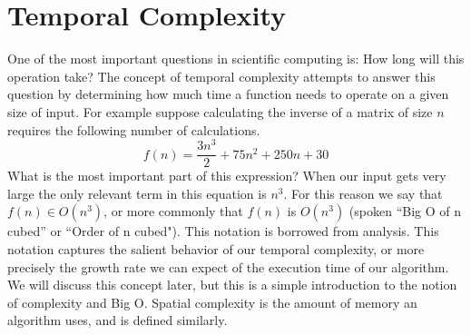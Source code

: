 

\section*{Temporal Complexity}



One of the most important questions in scientific computing is: How long will this operation take?  The concept of temporal complexity attempts to answer this question by determining how much time a function needs to operate on a given size of input.  For example suppose calculating the inverse of a matrix of size $n$ requires the following number of calculations.
\[
f(n) = \frac{3n^3}{2} + 75n^2 + 250n + 30
\]
What is the most important part of this expression? When our input gets very large the only relevant term in this equation is $n^3$. For this reason we say that $f(n) \in O(n^3)$, or more commonly that $f(n)$ is $O(n^3)$ (spoken ``Big O of n cubed'' or ``Order of n cubed"). This notation is borrowed from analysis. This notation captures the salient behavior of our temporal complexity, or more precisely the growth rate we can expect of the execution time of our algorithm. We will discuss this concept later, but this is a simple introduction to the notion of complexity and Big O. Spatial complexity is the amount of memory an algorithm uses, and is defined similarly. 

